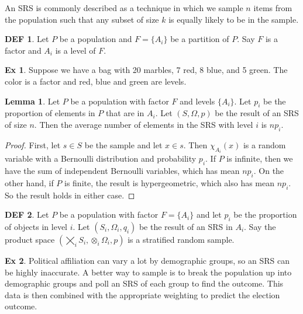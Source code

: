 \documentclass{article}
\theoremstyle{definition}\newtheorem{definition}{DEF}
\theoremstyle{definition}\newtheorem{example}{Ex}
\theoremstyle{lemma}\newtheorem{lemma}{Lemma}
\theoremstyle{corrolary}\newtheorem{corrolary}{Cor}
\begin{document}
An SRS is commonly described as a technique in which we sample $n$ items from the population such that any subset of size $k$ is equally likely to be in the sample.

\begin{definition}
Let $P$ be a population and $F=\{A_i\}$ be a partition of $P$.
Say $F$ is a factor and $A_i$ is a level of $F$.
\end{definition}

\begin{example}
Suppose we have a bag with 20 marbles, 7 red, 8 blue, and 5 green.
The color is a factor and red, blue and green are levels.
\end{example}

\begin{lemma}
Let $P$ be a population with factor $F$ and levels $\{A_i\}$.
Let $p_i$ be the proportion of elements in $P$ that are in $A_i$.
Let $(S, \Omega, p)$ be the result of an SRS of size $n$.
Then the average number of elements in the SRS with level $i$ is $np_i$.
\end{lemma}
\begin{proof}
First, let $s\in S$ be the sample and let $x\in s$.
Then $\chi_{A_i}(x)$ is a random variable with a Bernoulli distribution and probability $p_i$.
If $P$ is infinite, then we have the sum of independent Bernoulli variables, which has mean $np_i$.
On the other hand, if $P$ is finite, the result is hypergeometric, which also has mean $np_i$.
So the result holds in either case.
\end{proof}

\begin{definition}
Let $P$ be a population with factor $F=\{A_i\}$ and let $p_i$ be the proportion of objects in level $i$.
Let $(S_i, \Omega_i, q_i)$ be the result of an SRS in $A_i$.
Say the product space $(\bigtimes_i S_i, \otimes_i \Omega_i , p)$ is a stratified random sample.
\end{definition}

\begin{example}
Political affiliation can vary a lot by demographic groups, so an SRS can be highly inaccurate.
A better way to sample is to break the population up into demographic groups and poll an SRS of each group to find the outcome.
This data is then combined with the appropriate weighting to predict the election outcome.
\end{example}
\end{document}
